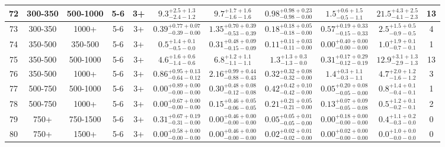 \documentclass[11pt, oneside]{article}
\begin{document}
\begin{table}
{\begin{tabular}{ |c|c|c|c|c||c|c|c|c||c|c| }
72 & 300-350 & 500-1000 & 5-6 & 3+ & $9.3^{+2.5+1.3}_{-2.4-1.2}$ & $9.7^{+1.7+1.6}_{-1.6-1.6}$ & $0.98^{+0.98+0.23}_{-0.98-0.00}$ & $1.5^{+0.6+1.5}_{-0.5-1.1}$ & $21.5^{+4.3+2.5}_{-4.1-2.3}$ & 13 \\ \hline
73 & 300-350 & 1000+ & 5-6 & 3+ & $0.39^{+0.77+0.07}_{-0.39-0.00}$ & $1.35^{+0.70+0.39}_{-0.53-0.39}$ & $0.18^{+0.18+0.05}_{-0.18-0.00}$ & $0.57^{+0.19+0.33}_{-0.15-0.33}$ & $2.5^{+1.5+0.5}_{-0.9-0.5}$ & 4 \\ \hline
74 & 350-500 & 350-500 & 5-6 & 3+ & $0.5^{+1.4+0.1}_{-0.5-0.0}$ & $0.31^{+0.48+0.09}_{-0.15-0.09}$ & $0.11^{+0.11+0.03}_{-0.11-0.00}$ & $0.00^{+0.40+0.00}_{-0.00-0.00}$ & $1.0^{+1.9+0.1}_{-0.7-0.1}$ & 1 \\ \hline
75 & 350-500 & 500-1000 & 5-6 & 3+ & $4.6^{+1.6+0.6}_{-1.4-0.6}$ & $6.8^{+1.2+1.1}_{-1.1-1.1}$ & $1.3^{+1.3+0.3}_{-1.3-0.0}$ & $0.31^{+0.17+0.29}_{-0.12-0.19}$ & $12.9^{+3.1+1.3}_{-2.9-1.3}$ & 13 \\ \hline
76 & 350-500 & 1000+ & 5-6 & 3+ & $0.86^{+0.95+0.13}_{-0.64-0.12}$ & $2.16^{+0.99+0.44}_{-0.88-0.43}$ & $0.32^{+0.32+0.08}_{-0.32-0.00}$ & $1.4^{+0.3+1.1}_{-0.3-1.1}$ & $4.7^{+2.0+1.2}_{-1.6-1.2}$ & 3 \\ \hline
77 & 500-750 & 500-1000 & 5-6 & 3+ & $0.00^{+0.89+0.00}_{-0.00-0.00}$ & $0.30^{+0.48+0.08}_{-0.12-0.08}$ & $0.42^{+0.42+0.10}_{-0.42-0.00}$ & $0.05^{+0.20+0.08}_{-0.05-0.00}$ & $0.8^{+1.4+0.1}_{-0.4-0.1}$ & 1 \\ \hline
78 & 500-750 & 1000+ & 5-6 & 3+ & $0.00^{+0.67+0.00}_{-0.00-0.00}$ & $0.15^{+0.46+0.05}_{-0.06-0.05}$ & $0.21^{+0.21+0.05}_{-0.21-0.00}$ & $0.13^{+0.07+0.09}_{-0.05-0.08}$ & $0.5^{+1.2+0.1}_{-0.2-0.1}$ & 2 \\ \hline
79 & 750+ & 750-1500 & 5-6 & 3+ & $0.31^{+0.67+0.19}_{-0.31-0.00}$ & $0.00^{+0.46+0.00}_{-0.00-0.00}$ & $0.05^{+0.05+0.01}_{-0.05-0.00}$ & $0.00^{+0.18+0.00}_{-0.00-0.00}$ & $0.4^{+1.1+0.2}_{-0.3-0.0}$ & 0 \\ \hline
80 & 750+ & 1500+ & 5-6 & 3+ & $0.00^{+0.58+0.00}_{-0.00-0.00}$ & $0.00^{+0.46+0.00}_{-0.00-0.00}$ & $0.02^{+0.02+0.01}_{-0.02-0.00}$ & $0.00^{+0.02+0.00}_{-0.00-0.00}$ & $0.0^{+1.0+0.0}_{-0.0-0.0}$ & 0 \\ \hline
\end{tabular}}
\end{table}
\end{document}

